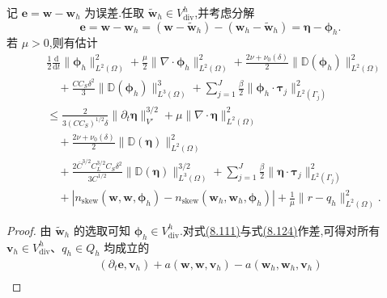\begin{lemma}[误差估计所需的微分不等式]
\label{lem:smagorinsky-error-differential-estimate}
记 $\bm{e}=\bm{w}-\bm{w}_h$ 为误差.任取 $\widetilde{\bm{w}}_h\in V_{\mathrm{div}}^h$,并考虑分解
\begin{equation}\label{eq:smagorinsky-error-decomposition}
\bm{e}=\bm{w}-\bm{w}_h
 =(\bm{w}-\widetilde{\bm{w}}_h)
  -(\bm{w}_h-\widetilde{\bm{w}}_h)
 =\symbf{\eta}-\symbf{\phi}_h.
\end{equation}
若 $\mu>0$,则有估计
\begin{equation}\label{eq:smagorinsky-error-differential-bound}
\begin{aligned}
 &\frac12\frac{\mathrm{d}}{\mathrm{d}t}
       \|\symbf{\phi}_h\|_{L^2(\Omega)}^2
  +\frac\mu2\|\nabla\cdot\symbf{\phi}_h\|_{L^2(\Omega)}^2
  +\frac{2\nu+\nu_0(\delta)}2
       \|\mathbb{D}(\symbf{\phi}_h)\|_{L^2(\Omega)}^2\\
 &\quad+\frac{C C_S\delta^2}{3}
       \|\mathbb{D}(\symbf{\phi}_h)\|_{L^3(\Omega)}^3
  +\sum_{j=1}^J\frac\beta2
       \|\symbf{\phi}_h\cdot\symbf{\tau}_j\|_{L^2(\Gamma_j)}^2\\
 &\le \frac{2}{3(CC_S)^{1/2}\delta}
       \|\partial_t\symbf{\eta}\|_{V'}^{3/2}
  +\mu\|\nabla\cdot\symbf{\eta}\|_{L^2(\Omega)}^2\\
 &\quad+\frac{2\nu+\nu_0(\delta)}2
       \|\mathbb{D}(\symbf{\eta})\|_{L^2(\Omega)}^2\\
 &\quad+\frac{2\overline C^{3/2}C_L^{3/2}C_S\delta^2}{3C^{1/2}}
       \|\mathbb{D}(\symbf{\eta})\|_{L^3(\Omega)}^{3/2}
  +\sum_{j=1}^J\frac\beta2
       \|\symbf{\eta}\cdot\symbf{\tau}_j\|_{L^2(\Gamma_j)}^2\\
 &\quad+\left|n_{\mathrm{skew}}(\bm{w},\bm{w},\symbf{\phi}_h)
       -n_{\mathrm{skew}}(\bm{w}_h,\bm{w}_h,\symbf{\phi}_h)\right|
  +\frac1\mu\|r-q_h\|_{L^2(\Omega)}^2.
\end{aligned}
\end{equation}
\begin{proof}
由 $\widetilde{\bm{w}}_h$ 的选取可知 $\symbf{\phi}_h\in V_{\mathrm{div}}^h$.对式\hyperref[eq:smagorinsky-generalized-weak-form]{(8.111)}与式\hyperref[eq:smagorinsky-continuous-time-fem-problem]{(8.124)}作差,可得对所有 $\bm{v}_h\in V_{\mathrm{div}}^h$、$q_h\in Q_h$ 均成立的
\begin{equation}\label{eq:smagorinsky-error-equation}
\begin{aligned}
 (\partial_t\bm{e},\bm{v}_h)
  +a(\bm{w},\bm{w},\bm{v}_h)
  -a(\bm{w}_h,\bm{w}_h,\bm{v}_h)\\

\end{aligned}
\end{equation}
\end{proof}
\end{lemma}
